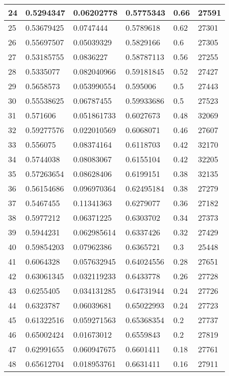 \begin{longtable}{|l|l|l|l|l|l|}
24 & 0.5294347 & 0.06202778 & 0.5775343 & 0.66 & 27591 \\ \hline 
25 & 0.53679425 & 0.0747444 & 0.5789618 & 0.62 & 27301 \\ \hline 
26 & 0.55697507 & 0.05039329 & 0.5829166 & 0.6 & 27305 \\ \hline 
27 & 0.53185755 & 0.0836227 & 0.58787113 & 0.56 & 27255 \\ \hline 
28 & 0.5335077 & 0.082040966 & 0.59181845 & 0.52 & 27427 \\ \hline 
29 & 0.5658573 & 0.053990554 & 0.595006 & 0.5 & 27443 \\ \hline 
30 & 0.55538625 & 0.06787455 & 0.59933686 & 0.5 & 27523 \\ \hline 
31 & 0.571606 & 0.051861733 & 0.6027673 & 0.48 & 32069 \\ \hline 
32 & 0.59277576 & 0.022010569 & 0.6068071 & 0.46 & 27607 \\ \hline 
33 & 0.556075 & 0.08374164 & 0.6118703 & 0.42 & 32170 \\ \hline 
34 & 0.5744038 & 0.08083067 & 0.6155104 & 0.42 & 32205 \\ \hline 
35 & 0.57263654 & 0.08628406 & 0.6199151 & 0.38 & 32135 \\ \hline 
36 & 0.56154686 & 0.096970364 & 0.62495184 & 0.38 & 27279 \\ \hline 
37 & 0.5467455 & 0.11341363 & 0.6279077 & 0.36 & 27182 \\ \hline 
38 & 0.5977212 & 0.06371225 & 0.6303702 & 0.34 & 27373 \\ \hline 
39 & 0.5944231 & 0.062985614 & 0.6337426 & 0.32 & 27429 \\ \hline 
40 & 0.59854203 & 0.07962386 & 0.6365721 & 0.3 & 25448 \\ \hline 
41 & 0.6064328 & 0.057632945 & 0.64024556 & 0.28 & 27651 \\ \hline 
42 & 0.63061345 & 0.032119233 & 0.6433778 & 0.26 & 27728 \\ \hline 
43 & 0.6255405 & 0.034131285 & 0.64731944 & 0.24 & 27726 \\ \hline 
44 & 0.6323787 & 0.06039681 & 0.65022993 & 0.24 & 27723 \\ \hline 
45 & 0.61322516 & 0.059271563 & 0.65368354 & 0.2 & 27737 \\ \hline 
46 & 0.65002424 & 0.01673012 & 0.6559843 & 0.2 & 27819 \\ \hline 
47 & 0.62991655 & 0.060947675 & 0.6601411 & 0.18 & 27761 \\ \hline 
48 & 0.65612704 & 0.018953761 & 0.6631411 & 0.16 & 27911 \\ \hline 

\end{longtable}
